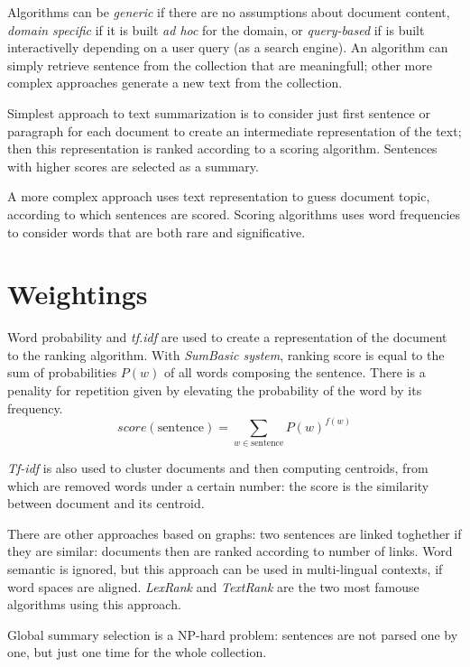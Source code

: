 \documentclass[11pt, a4page]{article}
\begin{document}
Algorithms can be \textit{generic} if there are no assumptions about document content, \textit{domain specific} if it is built \textit{ad hoc} for the domain, or \textit{query-based} if is built interactivelly depending on a user query (as a search engine).
An algorithm can simply retrieve sentence from the collection that are meaningfull; other more complex approaches generate a new text from the collection.

Simplest approach to text summarization is to consider just first sentence or paragraph for each document to create an intermediate representation of the text; then this representation is ranked according to a scoring algorithm.
Sentences with higher scores are selected as a summary.

A more complex approach uses text representation to guess document topic, according to which sentences are scored.
Scoring algorithms uses word frequencies to consider words that are both rare and significative.

\section{Weightings}
Word probability and \textit{tf.idf} are used to create a representation of the document to the ranking algorithm.
With \textit{SumBasic system}, ranking score is equal to the sum of probabilities $P(w)$ of all words composing the sentence.
There is a penality for repetition given by elevating the probability of the word by its frequency.
\begin{equation*}
  score(\text{sentence}) = \sum_{w \in \text{sentence}} P(w)^{f(w)}
\end{equation*}

\textit{Tf-idf} is also used to cluster documents and then computing centroids, from which are removed words under a certain number: the score is the similarity between document and its centroid.

There are other approaches based on graphs: two sentences are linked toghether if they are similar: documents then are ranked according to number of links.
Word semantic is ignored, but this approach can be used in multi-lingual contexts, if word spaces are aligned.
\textit{LexRank} and \textit{TextRank} are the two most famouse algorithms using this approach.

Global summary selection is a NP-hard problem: sentences are not parsed one by one, but just one time for the whole collection.
\end{document}
